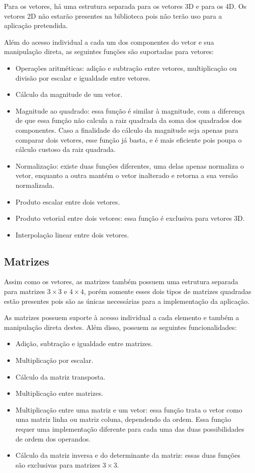 Para os vetores, há uma estrutura separada para os vetores 3D e para os 4D. Os vetores 
2D não estarão presentes na biblioteca pois não terão uso para a aplicação pretendida.

Além do acesso individual a cada um dos componentes do vetor e sua manipulação direta, 
as seguintes funções são suportadas para vetores:
\begin{itemize}
    \item Operações aritméticas: adição e subtração entre vetores, multiplicação ou 
        divisão por escalar e igualdade entre vetores.
    \item Cálculo da magnitude de um vetor.
    \item Magnitude ao quadrado: essa função é similar à magnitude, com a diferença de 
        que essa função não calcula a raiz quadrada da soma dos quadrados dos 
        componentes. Caso a finalidade do cálculo da magnitude seja apenas para comparar 
        dois vetores, esse função já basta, e é mais eficiente pois poupa o cálculo 
        custoso da raiz quadrada.
    \item Normalização: existe duas funções diferentes, uma delas apenas normaliza o 
        vetor, enquanto a outra mantém o vetor inalterado e retorna a sua versão 
        normalizada.
    \item Produto escalar entre dois vetores.
    \item Produto vetorial entre dois vetores: essa função é exclusiva para vetores 
        3D.
    \item Interpolação linear entre dois vetores.
\end{itemize}

\subsection{Matrizes}

Assim como os vetores, as matrizes também possuem uma estrutura separada para matrizes 
$3 \times 3$ e $4 \times 4$, porém somente esses dois tipos de matrizes quadradas estão 
presentes pois são as únicas necessárias para a implementação da aplicação.

As matrizes possuem suporte à acesso individual a cada elemento e também a manipulação 
direta destes. Além disso, possuem as seguintes funcionalidades:
\begin{itemize}
    \item Adição, subtração e igualdade entre matrizes.
    \item Multiplicação por escalar.
    \item Cálculo da matriz transposta.
    \item Multiplicação entre matrizes.
    \item Multiplicação entre uma matriz e um vetor: essa função trata o vetor como uma 
        matriz linha ou matriz coluna, dependendo da ordem. Essa função requer uma 
        implementação diferente para cada uma das duas possibilidades de ordem dos 
        operandos.
    \item Cálculo da matriz inversa e do determinante da matriz: essas duas funções são 
        exclusivas para matrizes $3 \times 3$.
\end{itemize}


